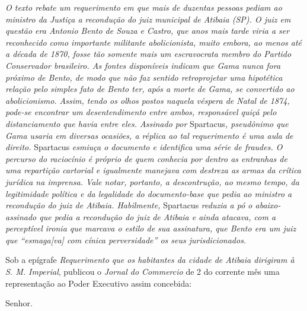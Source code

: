 \begin{didascalia}
\emph{O texto rebate um requerimento em que mais de duzentas pessoas
pediam ao ministro da Justiça a recondução do juiz municipal de Atibaia
(SP). O juiz em questão era Antonio Bento de Souza e Castro, que anos
mais tarde viria a ser reconhecido como importante militante
abolicionista, muito embora, ao menos até a década de 1870, fosse tão
somente mais um escravocrata membro do Partido Conservador brasileiro.
As fontes disponíveis indicam que Gama nunca fora próximo de Bento, de
modo que não faz sentido retroprojetar uma hipotética relação pelo
simples fato de Bento ter, após a morte de Gama, se convertido ao
abolicionismo. Assim, tendo os olhos postos naquela véspera de Natal de
1874, pode-se encontrar um desentendimento entre ambos, responsável
quiçá pelo distanciamento que havia entre eles. Assinado por}
Spartacus\emph{, pseudônimo que Gama usaria em diversas ocasiões, a
réplica ao tal requerimento é uma aula de direito.} Spartacus
\emph{esmiuça o documento e identifica uma série de fraudes. O percurso
do raciocínio é próprio de quem conhecia por dentro as entranhas de uma
repartição cartorial e igualmente manejava com destreza as armas da
crítica jurídica na imprensa. Vale notar, portanto, a descontrução, ao
mesmo tempo, da legitimidade política e da legalidade do documento-base
que pedia ao ministro a recondução do juiz de Atibaia. Habilmente,}
Spartacus \emph{reduzia a pó o abaixo-assinado que pedia a recondução do
juiz de Atibaia e ainda atacava, com a perceptível ironia que marcava o
estilo de sua assinatura, que Bento era um juiz que ``esmaga{[}va{]} com
cínica perversidade'' os seus jurisdicionados.}
\end{didascalia}

\asterisc{}

Sob a epígrafe \emph{Requerimento que os habitantes da cidade de Atibaia
dirigiram à S. M. Imperial}, publicou o \emph{Jornal do Commercio} de 2
do corrente mês uma representação ao Poder Executivo assim concebida:

Senhor.


